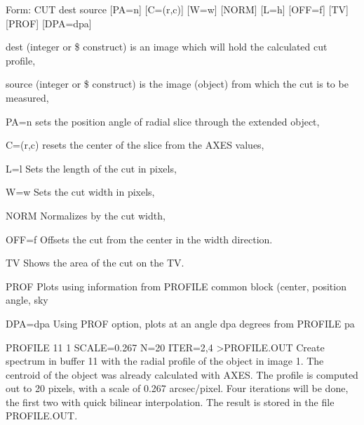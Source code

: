 {\newpage\clearpage
{}%
\begin{command}
  \item[Form: CUT dest source {[PA=n]} {[C=(r,c)]} {[W=w]} {[NORM]} {[L=h]}
       {[OFF=f]} {[TV]} {[PROF]} {[DPA=dpa]} \hfill]{}
  \item[dest]{(integer or \$ construct) is an image which
       will hold the calculated cut profile,}
  \item[source]{(integer or \$ construct) is the image (object)
       from which the cut is to be measured,}
  \item[PA=n]{sets the position angle of radial slice through the 
       extended object,}
  \item[C=(r,c)]{resets the center of the slice from the AXES values,}
  \item[L=l]{Sets the length of the cut in pixels,}
  \item[W=w]{Sets the cut width in pixels,}
  \item[NORM]{Normalizes by the cut width,}
  \item[OFF=f]{Offsets the cut from the center in the width direction.}
  \item[TV]{Shows the area of the cut on the TV.}
  \item[PROF]{Plots using information from PROFILE common block (center, 
        position angle, sky}
  \item[DPA=dpa]{Using PROF option, plots at an angle dpa degrees from
        PROFILE pa}
\end{command}%
\lthtmlfigureZ
\lthtmlcheckvsize\clearpage}

{\newpage\clearpage
{}%
\begin{example}
  \item[PROFILE 11 1 SCALE=0.267 N=20 ITER=2,4 >PROFILE.OUT\hfill]{Create
       spectrum in buffer 11 with the radial profile of the object in image
       1.  The centroid of the object was already calculated with AXES.
       The profile is computed out to 20 pixels, with a scale of 0.267
       arcsec/pixel.  Four iterations will be done, the first two with
       quick bilinear interpolation.  The result is stored in the file
       PROFILE.OUT.}
\end{example}%
\lthtmlfigureZ
\lthtmlcheckvsize\clearpage}

